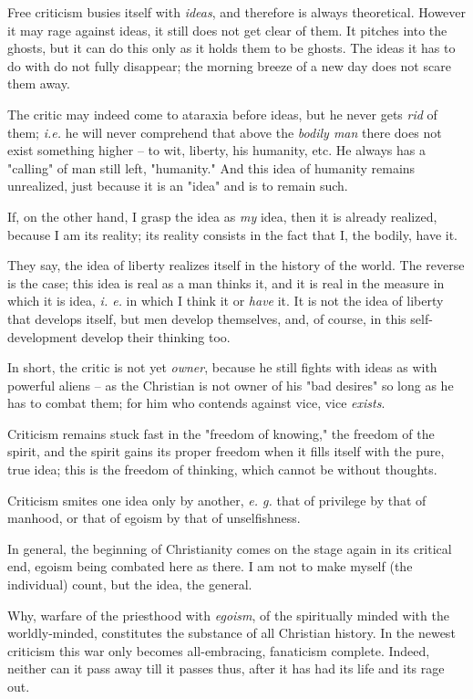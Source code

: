 \documentclass[a4paper]{book}
\begin{document}
Free criticism busies itself with \textit{ideas}, and therefore is always 
theoretical. However it may rage against ideas, it still does not get clear of 
them. It pitches into the ghosts, but it can do this only as it holds them to 
be ghosts. The ideas it has to do with do not fully disappear; the morning 
breeze of a new day does not scare them away.

The critic may indeed come to ataraxia before ideas, but he never gets 
\textit{rid} of them; \textit{i.e.} he will never comprehend that above the 
\textit{bodily man} there does not exist something higher -- to wit, liberty, 
his humanity, etc. He always has a "{}calling"{} of man still left, 
"{}humanity."{} And this idea of humanity remains unrealized, just because it 
is an "{}idea"{} and is to remain such.

If, on the other hand, I grasp the idea as \textit{my} idea, then it is 
already realized, because I am its reality; its reality consists in the fact 
that I, the bodily, have it.

They say, the idea of liberty realizes itself in the history of the world. The 
reverse is the case; this idea is real as a man thinks it, and it is real in 
the measure in which it is idea, \textit{i. e.} in which I think it or 
\textit{have} it. It is not the idea of liberty that develops itself, but men 
develop themselves, and, of course, in this self-development develop their 
thinking too.

In short, the critic is not yet \textit{owner}, because he still fights with 
ideas as with powerful aliens -- as the Christian is not owner of his "{}bad 
desires"{} so long as he has to combat them; for him who contends against 
vice, vice \textit{exists}.

Criticism remains stuck fast in the "{}freedom of knowing,"{} the freedom of 
the spirit, and the spirit gains its proper freedom when it fills itself with 
the pure, true idea; this is the freedom of thinking, which cannot be without 
thoughts.

Criticism smites one idea only by another, \textit{e. g.} that of privilege by 
that of manhood, or that of egoism by that of unselfishness.

In general, the beginning of Christianity comes on the stage again in its 
critical end, egoism being combated here as there. I am not to make myself 
(the individual) count, but the idea, the general.

Why, warfare of the priesthood with \textit{egoism}, of the spiritually minded 
with the worldly-minded, constitutes the substance of all Christian history. 
In the newest criticism this war only becomes all-embracing, fanaticism 
complete. Indeed, neither can it pass away till it passes thus, after it has 
had its life and its rage out.
\end{document}
